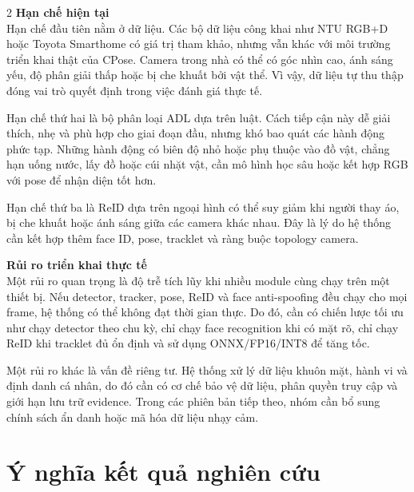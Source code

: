 \documentclass[a4paper, twoside, 12pt]{article}
\begin{document}
\begin{multicols}{2}
\vspace{0.1cm}
\hspace*{0.5cm}\textbf{Hạn chế hiện tại}\\
Hạn chế đầu tiên nằm ở dữ liệu. Các bộ dữ liệu công khai như NTU RGB+D hoặc Toyota Smarthome có giá trị tham khảo, nhưng vẫn khác với môi trường triển khai thật của CPose. Camera trong nhà có thể có góc nhìn cao, ánh sáng yếu, độ phân giải thấp hoặc bị che khuất bởi vật thể. Vì vậy, dữ liệu tự thu thập đóng vai trò quyết định trong việc đánh giá thực tế.

Hạn chế thứ hai là bộ phân loại ADL dựa trên luật. Cách tiếp cận này dễ giải thích, nhẹ và phù hợp cho giai đoạn đầu, nhưng khó bao quát các hành động phức tạp. Những hành động có biên độ nhỏ hoặc phụ thuộc vào đồ vật, chẳng hạn uống nước, lấy đồ hoặc cúi nhặt vật, cần mô hình học sâu hoặc kết hợp RGB với pose để nhận diện tốt hơn.

Hạn chế thứ ba là ReID dựa trên ngoại hình có thể suy giảm khi người thay áo, bị che khuất hoặc ánh sáng giữa các camera khác nhau. Đây là lý do hệ thống cần kết hợp thêm face ID, pose, tracklet và ràng buộc topology camera.

\vspace{0.1cm}
\hspace*{0.5cm}\textbf{Rủi ro triển khai thực tế}\\
Một rủi ro quan trọng là độ trễ tích lũy khi nhiều module cùng chạy trên một thiết bị. Nếu detector, tracker, pose, ReID và face anti-spoofing đều chạy cho mọi frame, hệ thống có thể không đạt thời gian thực. Do đó, cần có chiến lược tối ưu như chạy detector theo chu kỳ, chỉ chạy face recognition khi có mặt rõ, chỉ chạy ReID khi tracklet đủ ổn định và sử dụng ONNX/FP16/INT8 để tăng tốc.

Một rủi ro khác là vấn đề riêng tư. Hệ thống xử lý dữ liệu khuôn mặt, hành vi và định danh cá nhân, do đó cần có cơ chế bảo vệ dữ liệu, phân quyền truy cập và giới hạn lưu trữ evidence. Trong các phiên bản tiếp theo, nhóm cần bổ sung chính sách ẩn danh hoặc mã hóa dữ liệu nhạy cảm.


\vspace{0.2cm}

\section{Ý nghĩa kết quả nghiên cứu}
\vspace{-0.6cm}


\end{multicols}
\end{document}
